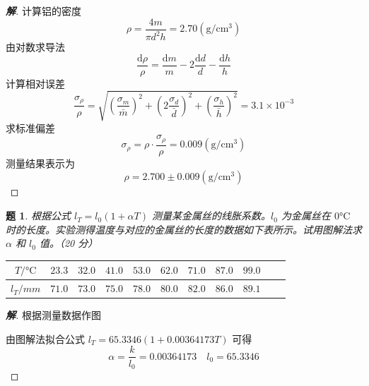 \documentclass{article}
\newtheorem{problem}{题}
\newenvironment{solution}
{\begin{proof}[\textbf{解}]\renewcommand{\qedsymbol}{}}
{\end{proof}}
\begin{document}
\begin{solution}
计算铝的密度
$$\rho = \frac{4m}{\pi d^2 h} = 2.70 \mathrm{(g/cm^3)}$$
由对数求导法
\[
\newcommand{\dd}{\mathrm{d}}
\frac{\dd\rho}{\rho} = \frac{\dd m}{m} - 2\frac{\dd d}{d} - \frac{\dd h}{h}
\]
计算相对误差
$$\frac{\sigma_\rho}{\rho} = \sqrt{\left(\frac{\sigma_m}{\bar m}\right)^2 + \left(2\frac{\sigma_d}{\bar d}\right)^2 + \left(\frac{\sigma_h}{\bar h}\right)^2} = 3.1 \times 10^{-3}$$
求标准偏差
$$\sigma_\rho = \rho \cdot \frac{\sigma_\rho}{\rho} = 0.009 \mathrm{(g/cm^3)}$$
测量结果表示为
\[
\rho = 2.700 \pm 0.009 \mathrm{(g/cm^3)}
\]
\end{solution}


\begin{problem}
根据公式 $l_T = l_0(1+\alpha T)$ 测量某金属丝的线胀系数。$l_0$ 为金属丝在 $0\unit{\celsius}$ 时的长度。实验测得温度与对应的金属丝的长度的数据如下表所示。试用图解法求 $\alpha$ 和 $l_0$ 值。（20 分）

\begin{table}[h]
\centering
\begin{tabular}{ccccccccccc}
\toprule
$T / \unit{\celsius}$ & $23.3$ & $32.0$ & $41.0$ & $53.0$ & $62.0$ & $71.0$ & $87.0$ & $99.0$ \\ \midrule
$l_T / \unit{mm}$ & $71.0$ & $73.0$ & $75.0$ & $78.0$ & $80.0$ & $82.0$ & $86.0$ & $89.1$ \\ \bottomrule
\end{tabular}
\end{table}
\end{problem}

\begin{solution}
根据测量数据作图
\begin{center}
\end{center}

由图解法拟合公式 $l_T = 65.3346(1 + 0.00364173T)$ 可得
\[\alpha = \frac{k}{l_0} = 0.00364173 \quad l_0 = 65.3346\]
\end{solution}
\end{document}
